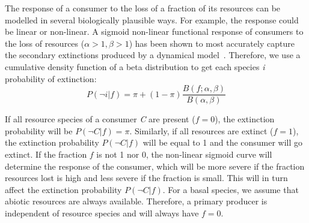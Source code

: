 \documentclass[12pt]{article}
\begin{document}
\begin{spacing}{2.0}
        The response of a consumer to the loss of a fraction of its resources can be modelled in several biologically plausible ways. For example, the response could be linear or non-linear.
        A sigmoid non-linear functional response of consumers to the loss of resources ($\alpha >1, \beta >1$) has been shown to most accurately capture the secondary extinctions produced by a dynamical model~\citep{Eklof2013}.
        Therefore, we use a cumulative density function of a beta distribution to get each species \textit{i} probability of extinction:
        \begin{equation}
        \label{betafunc}
        P(\lnot i|f) = \pi + (1 - \pi) \frac{B(f;\alpha,\beta)}{B(\alpha,\beta)}
        \end{equation}
        

        If all resource species of a consumer \textit{C} are present ($f = 0$), the extinction probability will be $P(\lnot C|f) = \pi$. 
        Similarly, if all resources are extinct ($f = 1$), the extinction probability $P(\lnot C|f)$ will be equal to 1 and the consumer will go extinct.
        If the fraction $f$ is not 1 nor 0, the non-linear sigmoid curve will determine the response of the consumer, which will be more severe if the fraction resources lost is high and less severe if the fraction is small. This will in turn affect the extinction probability $P(\lnot C|f)$. 
        For a basal species, we assume that abiotic resources are always available. Therefore, a primary producer is independent of resource species and will always have $f = 0$.  
        


\end{spacing}
\end{document}
